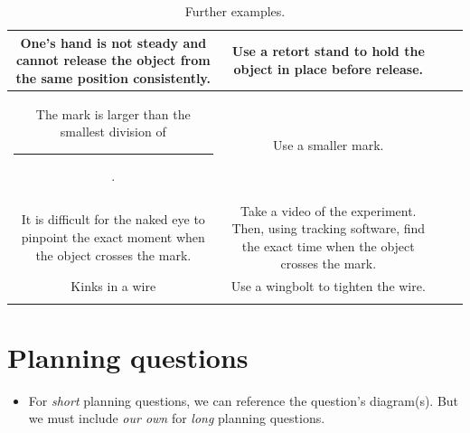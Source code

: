 \documentclass[oneside]{book}
\begin{document}
\begin{itemize}
\begin{longtable}{|Sc|Sc|}
        \hline
        \begin{minipage}{0.5\textwidth-25.2pt}
            One's hand is not steady and cannot release the object from the same position consistently.
        \end{minipage}& 
        \begin{minipage}{0.5\textwidth-25.2pt}
            Use a retort stand to hold the object in place before release.
        \end{minipage}\\
        \hline
        \begin{minipage}{0.5\textwidth-25.2pt}
            The mark is larger than the smallest division of \rule{0.5cm}{0.05mm}.
        \end{minipage}&
        Use a smaller mark.\\
        \hline
        \begin{minipage}{0.5\textwidth-25.2pt}
            It is difficult for the naked eye to pinpoint the exact moment when the object crosses the mark. 
        \end{minipage}&
        \begin{minipage}{0.5\textwidth-25.2pt}
            Take a video of the experiment. Then, using tracking software, find the exact time when the object crosses the mark. 
        \end{minipage}\\
        \hline
        Kinks in a wire & 
        \begin{minipage}{0.5\textwidth-25.2pt}
            Use a wingbolt to tighten the wire.
        \end{minipage}\\
        \hline
    \caption{Further examples.}
    \label{table:sources-of-error-and-solutions}
    \end{longtable}
\end{itemize}
\section{Planning questions}
\begin{itemize}
    \item For \emph{short} planning questions, we can reference the question's diagram(s). But we must include \emph{our own} for \emph{long} planning questions.
\end{itemize}
\end{document}
